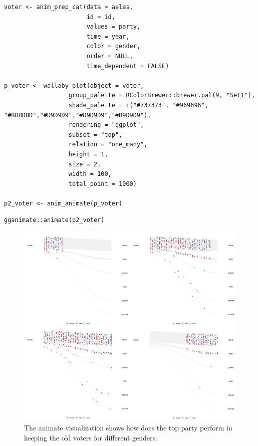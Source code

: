 \begin{verbatim}
voter <- anim_prep_cat(data = aeles,
                       id = id,
                       values = party,
                       time = year,
                       color = gender,
                       order = NULL,
                       time_dependent = FALSE)

p_voter <- wallaby_plot(object = voter,
                  group_palette = RColorBrewer::brewer.pal(9, "Set1"),
                  shade_palette = c("#737373", "#969696", "#BDBDBD","#D9D9D9","#D9D9D9","#D9D9D9"),
                  rendering = "ggplot",
                  subset = "top",
                  relation = "one_many",
                  height = 1,
                  size = 2,
                  width = 100,
                  total_point = 1000)

p2_voter <- anim_animate(p_voter)
\end{verbatim}

\begin{verbatim}
gganimate::animate(p2_voter)
\end{verbatim}

\begin{figure}

{\centering \includegraphics[width=1\linewidth]{figures/animation-voter} 

}

\caption{The animate visualization shows how does the top party perform in keeping the old  voters for different genders.}\label{fig:voter-figure}
\end{figure}

